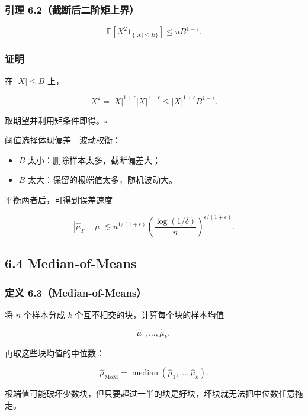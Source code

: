 \documentclass[
  11pt,
  a4paper,
]{ctexart}
\providecommand{\tightlist}{%
  \setlength{\itemsep}{0pt}\setlength{\parskip}{0pt}}
\begin{document}
\subsubsection{引理
6.2（截断后二阶矩上界）}\label{ux5f15ux7406-6.2ux622aux65adux540eux4e8cux9636ux77e9ux4e0aux754c}

\[
\mathbb E[X^2\mathbf1_{\{|X|\le B\}}]
\le uB^{1-\epsilon}.
\]

\subsubsection{证明}\label{ux8bc1ux660e-8}

在 \(|X|\le B\) 上，

\[
X^2=|X|^{1+\epsilon}|X|^{1-\epsilon}
\le |X|^{1+\epsilon}B^{1-\epsilon}.
\]

取期望并利用矩条件即得。\(\square\)

阈值选择体现偏差---波动权衡：

\begin{itemize}
\tightlist
\item
  \(B\) 太小：删除样本太多，截断偏差大；
\item
  \(B\) 太大：保留的极端值太多，随机波动大。
\end{itemize}

平衡两者后，可得到误差速度

\[
|\widehat\mu_T-\mu|
\lesssim
u^{1/(1+\epsilon)}
\left(\frac{\log(1/\delta)}n\right)^{\epsilon/(1+\epsilon)}.
\]

\subsection{6.4 Median-of-Means}\label{median-of-means}

\subsubsection{定义
6.3（Median-of-Means）}\label{ux5b9aux4e49-6.3median-of-means}

将 \(n\) 个样本分成 \(k\) 个互不相交的块，计算每个块的样本均值

\[
\widehat\mu_1,\ldots,\widehat\mu_k,
\]

再取这些块均值的中位数：

\[
\widehat\mu_{\mathrm{MoM}}
=\operatorname{median}(\widehat\mu_1,\ldots,\widehat\mu_k).
\]

极端值可能破坏少数块，但只要超过一半的块是好块，坏块就无法把中位数任意拖走。
\end{document}
